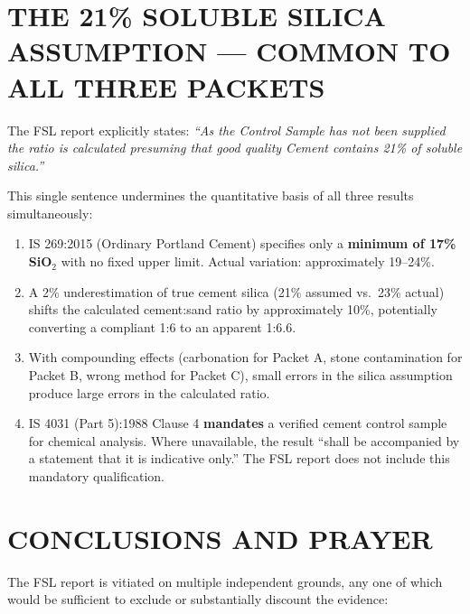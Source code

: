 \documentclass[12pt, a4paper]{article}
\begin{document}
\section{THE 21\% SOLUBLE SILICA ASSUMPTION --- COMMON TO ALL THREE PACKETS}

\begin{criticalbox}
The FSL report explicitly states: \textit{``As the Control Sample has not been supplied the ratio is calculated presuming that good quality Cement contains 21\% of soluble silica.''}

This single sentence undermines the quantitative basis of all three results simultaneously:

\begin{enumerate}
  \item IS 269:2015 (Ordinary Portland Cement) specifies only a \textbf{minimum of 17\% SiO$_2$} with no fixed upper limit. Actual variation: approximately 19--24\%.
  \item A 2\% underestimation of true cement silica (21\% assumed vs.\ 23\% actual) shifts the calculated cement:sand ratio by approximately 10\%, potentially converting a compliant 1:6 to an apparent 1:6.6.
  \item With compounding effects (carbonation for Packet A, stone contamination for Packet B, wrong method for Packet C), small errors in the silica assumption produce large errors in the calculated ratio.
  \item IS 4031 (Part 5):1988 Clause 4 \textbf{mandates} a verified cement control sample for chemical analysis. Where unavailable, the result ``shall be accompanied by a statement that it is indicative only.'' The FSL report does not include this mandatory qualification.
\end{enumerate}
\end{criticalbox}

\section{CONCLUSIONS AND PRAYER}

The FSL report is vitiated on multiple independent grounds, any one of which would be sufficient to exclude or substantially discount the evidence:
\end{document}

